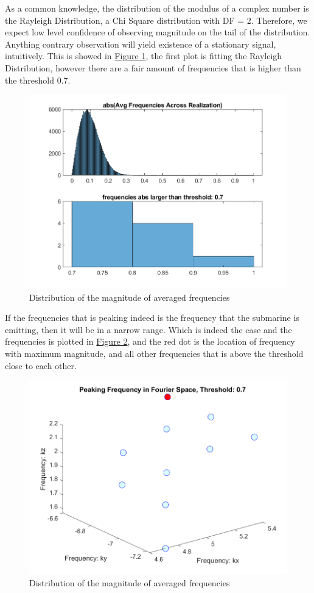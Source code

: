 \documentclass{article}
\begin{document}
    \par
    As a common knowledge, the distribution of the modulus of a complex number is the Rayleigh Distribution, a Chi Square distribution with DF = 2. 
    Therefore, we expect low level confidence of observing magnitude on the tail of the distribution. Anything contrary observation will yield existence of a stationary signal, intuitively. This is showed in \hyperref[fig:frequencies-mag-distribution]{Figure 1}, the first plot is fitting the Rayleigh Distribution, however there are a fair amount of frequencies that is higher than the threshold 0.7. 
    \begin{figure}[h]
        \centering
        \includegraphics*[width=0.7\linewidth]{freq-distribution.png}
        \caption{Distribution of the magnitude of averaged frequencies}
        \label{fig:frequencies-mag-distribution}
    \end{figure}
    
    \par
    If the frequencies that is peaking indeed is the frequency that the submarine is emitting, then it will be in a narrow range. Which is indeed the case and the frequencies is plotted in \hyperref[fig:peaking-freq]{Figure 2}, and the red dot is the location of frequency with maximum magnitude, and all other frequencies that is above the threshold close to each other. 
    
    \begin{figure}[h]
        \centering
        \includegraphics*[width=0.5\linewidth]{peaking-freq-position.png}
        \caption{Distribution of the magnitude of averaged frequencies}
        \label{fig:peaking-freq}
    \end{figure}
\end{document}
